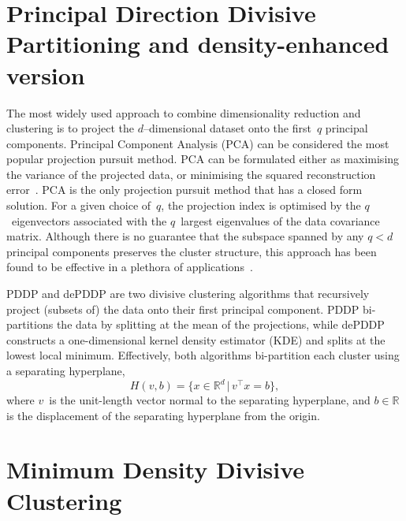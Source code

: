 \documentclass{book}
\def\R{\mathbb{R}}
\begin{document}
\section{Principal Direction Divisive Partitioning and density-enhanced version}

The most widely used approach to combine dimensionality reduction and
clustering is to project the $d$--dimensional dataset onto the first~$q$
principal components. 
%
Principal Component Analysis (PCA) can be considered the most popular
projection pursuit method. PCA can be formulated either as maximising the
variance of the projected data, or minimising the squared reconstruction
error~\cite{Jolliffe1986}. PCA is the only projection pursuit method that has a
closed form solution. For a given choice of~$q$, the projection index is
optimised by the $q$~eigenvectors associated with the $q$~largest eigenvalues
of the data covariance matrix.
%
Although there is no guarantee that the subspace spanned by any $q<d$ principal
components preserves the cluster structure, this approach has been found to be
effective in a plethora of applications~\cite{KriegelKZ2009}.


PDDP and dePDDP are two divisive clustering algorithms that recursively
project (subsets of) the data onto their first principal component.
PDDP bi-partitions the data by splitting at the mean of the projections, while
dePDDP constructs a one-dimensional kernel density estimator (KDE) and splits
at the lowest local minimum.
%
Effectively, both algorithms bi-partition each cluster 
using a separating hyperplane,
\[
H(v,b) = \{x \in \R^d \,|\, v^\top x= b\},
\]
where $v$~is the unit-length
vector normal to the separating hyperplane,
and $b \in \R$ is the displacement of the separating hyperplane from the origin.


\section{Minimum Density Divisive Clustering}
\end{document}
